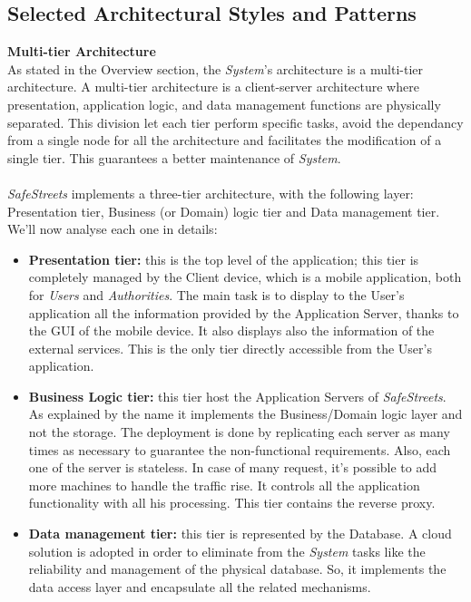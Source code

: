 \documentclass{article}
\begin{document}
	\subsection{Selected Architectural Styles and Patterns}
	{\bf Multi-tier Architecture} \\
	As stated in the Overview section, the {\it System}'s architecture is a multi-tier \mbox{architecture}. A multi-tier architecture is a client-server architecture where presentation, application logic, and data management functions are physically separated. This division let each tier perform specific tasks, avoid the dependancy from a single node for all the architecture and facilitates the modification of a single tier. This guarantees a better maintenance of {\it System}. \\ \\
	{\it SafeStreets} implements a three-tier architecture, with the following layer: Presentation tier, Business (or Domain) logic tier and Data management tier. We'll now analyse each one in details:
	\begin{itemize}
		\item {\bf Presentation tier:} this is the top level of the application; this tier is completely managed by the Client device, which is a mobile application, both for {\it Users} and {\it Authorities}. The main task is to display to the User's application all the information provided by the Application Server, thanks to the GUI of the mobile device. It also displays also the information of the external services. This is the only tier directly accessible from the User's application. 
		\item {\bf Business Logic tier:} this tier host the Application Servers of {\it SafeStreets}. As explained by the name it implements the Business/Domain logic layer and not the storage. The deployment is done by replicating each server as many times as necessary to guarantee the non-functional requirements. Also, each one of the server is stateless. In case of many request, it's possible to add more machines to handle the traffic rise. It controls all the application functionality with all his processing. This tier contains the reverse proxy.		
		\item {\bf Data management tier:} this tier is represented by the Database. A cloud solution is adopted in order to eliminate from the {\it System} tasks like the reliability and management of the physical database. So, it implements the data access layer and encapsulate all the related mechanisms.  
	\end{itemize}
\end{document}
